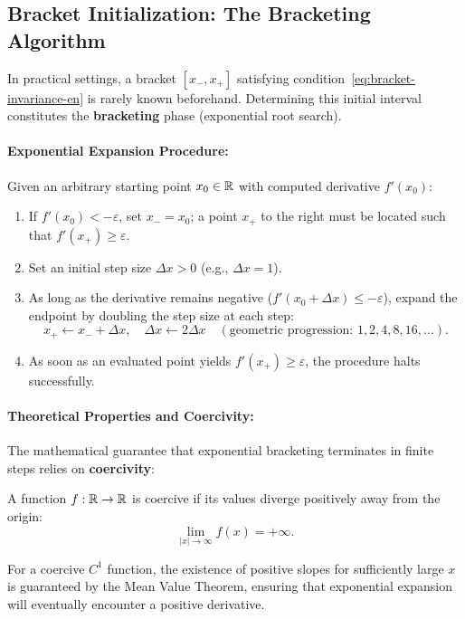\subsection{Bracket Initialization: The Bracketing Algorithm}
\label{subsec:bracketing-algorithm-en}
In practical settings, a bracket $[x_-, x_+]$ satisfying condition~\eqref{eq:bracket-invariance-en} is rarely known beforehand. Determining this initial interval constitutes the \textbf{bracketing} phase (exponential root search).

\paragraph{Exponential Expansion Procedure:}
Given an arbitrary starting point $x_0 \in \mathbb{R}$ with computed derivative $f'(x_0)$:
\begin{enumerate}
    \item If $f'(x_0) < -\varepsilon$, set $x_- = x_0$; a point $x_+$ to the right must be located such that $f'(x_+) \ge \varepsilon$.
    \item Set an initial step size $\Delta x > 0$ (e.g., $\Delta x = 1$).
    \item As long as the derivative remains negative ($f'(x_0 + \Delta x) \le -\varepsilon$), expand the endpoint by doubling the step size at each step:
    \begin{equation}
        x_+ \leftarrow x_- + \Delta x, \quad \Delta x \leftarrow 2 \Delta x \quad (\text{geometric progression: } 1, 2, 4, 8, 16, \dots).
        \label{eq:exponential-bracketing-step-en}
    \end{equation}
    \item As soon as an evaluated point yields $f'(x_+) \ge \varepsilon$, the procedure halts successfully.
\end{enumerate}

\paragraph{Theoretical Properties and Coercivity:}
The mathematical guarantee that exponential bracketing terminates in finite steps relies on \textbf{coercivity}:
\begin{definition}
A function $f: \mathbb{R} \to \mathbb{R}$ is coercive if its values diverge positively away from the origin:
\begin{equation}
    \lim_{|x| \to \infty} f(x) = +\infty.
\end{equation}
\end{definition}
For a coercive $C^1$ function, the existence of positive slopes for sufficiently large $x$ is guaranteed by the Mean Value Theorem, ensuring that exponential expansion will eventually encounter a positive derivative.


